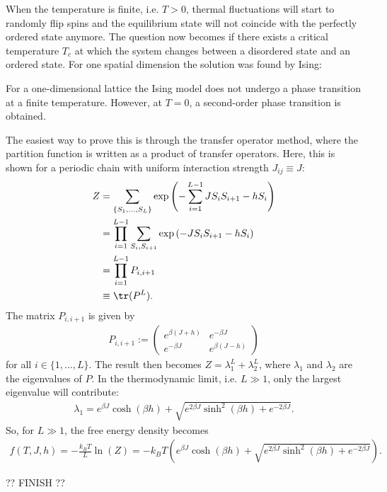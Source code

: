     When the temperature is finite, i.e. $T>0$, thermal fluctuations will start to randomly flip spins and the equilibrium state will not coincide with the perfectly ordered state anymore. The question now becomes if there exists a critical temperature $T_c$ at which the system changes between a disordered state and an ordered state. For one spatial dimension the solution was found by Ising:
    \begin{property}[$d=1$]
        For a one-dimensional lattice the Ising model does not undergo a phase transition at a finite temperature. However, at $T=0$, a second-order phase transition is obtained.

        The easiest way to prove this is through the transfer operator method, where the partition function is written as a product of transfer operators. Here, this is shown for a periodic chain with uniform interaction strength $J_{ij}\equiv J$:
        \begin{align}
            Z &= \sum_{\{S_1,\ldots,S_L\}}\exp\left(-\sum_{i=1}^{L-1}JS_iS_{i+1}-hS_i\right)\\
            &= \prod_{i=1}^{L-1}\sum_{S_i,S_{i+1}}\exp\left(-JS_iS_{i+1}-hS_i\right)\\
            &= \prod_{i=1}^{L-1}P_{i,i+1}\\
            &\equiv\tr(P^L).
        \end{align}
        The matrix $P_{i,i+1}$ is given by
        \begin{gather}
            P_{i,i+1} :=
            \begin{pmatrix}
                e^{\beta(J+h)}&e^{-\beta J}\\
                e^{-\beta J}&e^{\beta(J-h)}
            \end{pmatrix}
        \end{gather}
        for all $i\in\{1,\ldots,L\}$. The result then becomes $Z=\lambda^L_1+\lambda^L_2$, where $\lambda_1$ and $\lambda_2$ are the eigenvalues of $P$. In the thermodynamic limit, i.e. $L\gg1$, only the largest eigenvalue will contribute:
        \begin{gather}
            \lambda_1 = e^{\beta J}\cosh(\beta h) + \sqrt{e^{2\beta J}\sinh^2(\beta h)+e^{-2\beta J}}.
        \end{gather}
        So, for $L\gg1$, the free energy density becomes
        \begin{gather*}
            f(T,J,h) = -\frac{k_BT}{L}\ln(Z) = -k_BT\left(e^{\beta J}\cosh(\beta h) + \sqrt{e^{2\beta J}\sinh^2(\beta h)+e^{-2\beta J}}\right).
        \end{gather*}

        ?? FINISH ??
    \end{property}

